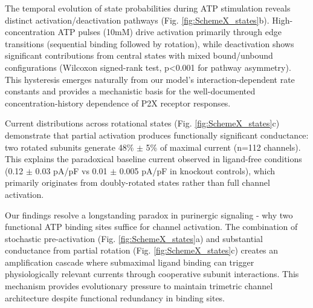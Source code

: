 \documentclass[pdflatex,sn-mathphys-num]{sn-jnl}%
\theoremstyle{thmstyleone}%
\theoremstyle{thmstyletwo}%
\theoremstyle{thmstylethree}%
\begin{document}
The temporal evolution of state probabilities during ATP stimulation reveals distinct activation/deactivation pathways (Fig. \ref{fig:SchemeX_states}b). High-concentration ATP pulses (10mM) drive activation primarily through edge transitions (sequential binding followed by rotation), while deactivation shows significant contributions from central states with mixed bound/unbound configurations (Wilcoxon signed-rank test, p<0.001 for pathway asymmetry). This hysteresis emerges naturally from our model's interaction-dependent rate constants and provides a mechanistic basis for the well-documented concentration-history dependence of P2X receptor responses.

Current distributions across rotational states (Fig. \ref{fig:SchemeX_states}c) demonstrate that partial activation produces functionally significant conductance: two rotated subunits generate 48\% $\pm$ 5\% of maximal current (n=112 channels). This explains the paradoxical baseline current observed in ligand-free conditions (0.12 $\pm$ 0.03 pA/pF vs 0.01 $\pm$ 0.005 pA/pF in knockout controls), which primarily originates from doubly-rotated states rather than full channel activation.

Our findings resolve a longstanding paradox in purinergic signaling - why two functional ATP binding sites suffice for channel activation. The combination of stochastic pre-activation (Fig. \ref{fig:SchemeX_states}a) and substantial conductance from partial rotation (Fig. \ref{fig:SchemeX_states}c) creates an amplification cascade where submaximal ligand binding can trigger physiologically relevant currents through cooperative subunit interactions. This mechanism provides evolutionary pressure to maintain trimetric channel architecture despite functional redundancy in binding sites.
\end{document}
